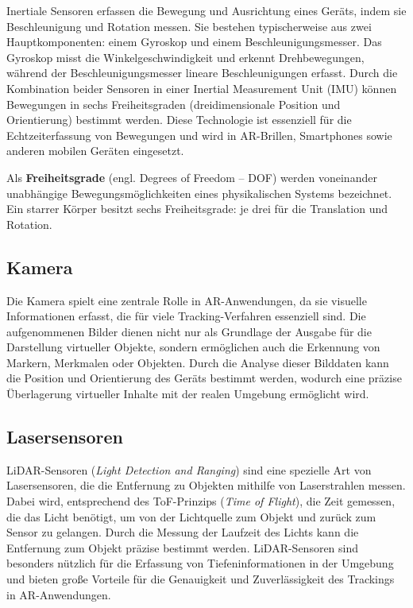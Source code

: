 Inertiale Sensoren erfassen die Bewegung und Ausrichtung eines Geräts, indem sie Beschleunigung und Rotation messen. Sie bestehen typischerweise aus zwei Hauptkomponenten: einem Gyroskop und einem Beschleunigungsmesser. Das Gyroskop misst die Winkelgeschwindigkeit und erkennt Drehbewegungen, während der Beschleunigungsmesser lineare Beschleunigungen erfasst. Durch die Kombination beider Sensoren in einer Inertial Measurement Unit (IMU) können Bewegungen in sechs Freiheitsgraden (dreidimensionale Position und Orientierung) bestimmt werden. Diese Technologie ist essenziell für die Echtzeiterfassung von Bewegungen und wird in AR-Brillen, Smartphones sowie anderen mobilen Geräten eingesetzt. \cite{doerner2022virtual}

\begin{tcolorbox}[colback=THAi-Blue!20!white, colframe=THAi-Blue]
    Als \textbf{Freiheitsgrade} (engl. Degrees of Freedom – DOF) werden voneinander unabhängige Bewegungsmöglichkeiten eines physikalischen Systems bezeichnet. Ein starrer Körper besitzt sechs Freiheitsgrade: je drei für die Translation und Rotation. \cite{wikipedia2024dof}
\end{tcolorbox}  

\subsection{Kamera}

Die Kamera spielt eine zentrale Rolle in AR-Anwendungen, da sie visuelle Informationen erfasst, die für viele Tracking-Verfahren essenziell sind. Die aufgenommenen Bilder dienen nicht nur als Grundlage der Ausgabe für die Darstellung virtueller Objekte, sondern ermöglichen auch die Erkennung von Markern, Merkmalen oder Objekten. Durch die Analyse dieser Bilddaten kann die Position und Orientierung des Geräts bestimmt werden, wodurch eine präzise Überlagerung virtueller Inhalte mit der realen Umgebung ermöglicht wird. \cite{doerner2022virtual}

\subsection{Lasersensoren}\label{LiDAR}

LiDAR-Sensoren (\emph{Light Detection and Ranging}) sind eine spezielle Art von Lasersensoren, die die Entfernung zu Objekten mithilfe von Laserstrahlen messen. Dabei wird, entsprechend des ToF-Prinzips (\emph{Time of Flight}), die Zeit gemessen, die das Licht benötigt, um von der Lichtquelle zum Objekt und zurück zum Sensor zu gelangen. Durch die Messung der Laufzeit des Lichts kann die Entfernung zum Objekt präzise bestimmt werden. LiDAR-Sensoren sind besonders nützlich für die Erfassung von Tiefeninformationen in der Umgebung und bieten große Vorteile für die Genauigkeit und Zuverlässigkeit des Trackings in AR-Anwendungen. \cite{doerner2022virtual, ibm2024lidar}


